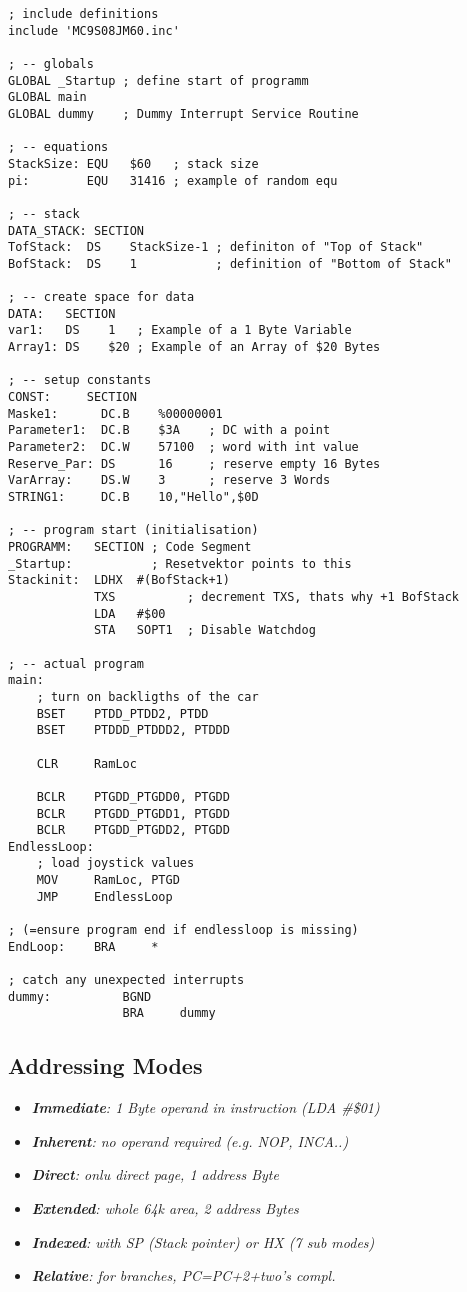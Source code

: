 \begin{lstlisting}
; include definitions
include 'MC9S08JM60.inc'

; -- globals
GLOBAL _Startup ; define start of programm
GLOBAL main
GLOBAL dummy    ; Dummy Interrupt Service Routine

; -- equations
StackSize: EQU   $60   ; stack size
pi:        EQU   31416 ; example of random equ

; -- stack
DATA_STACK: SECTION
TofStack:  DS    StackSize-1 ; definiton of "Top of Stack"
BofStack:  DS    1           ; definition of "Bottom of Stack"

; -- create space for data
DATA:   SECTION
var1:   DS    1   ; Example of a 1 Byte Variable
Array1: DS    $20 ; Example of an Array of $20 Bytes

; -- setup constants
CONST:     SECTION
Maske1:      DC.B    %00000001
Parameter1:  DC.B    $3A    ; DC with a point
Parameter2:  DC.W    57100  ; word with int value
Reserve_Par: DS      16     ; reserve empty 16 Bytes
VarArray:    DS.W    3      ; reserve 3 Words
STRING1:     DC.B    10,"Hello",$0D

; -- program start (initialisation)
PROGRAMM:   SECTION ; Code Segment
_Startup:           ; Resetvektor points to this
Stackinit:  LDHX  #(BofStack+1)
            TXS          ; decrement TXS, thats why +1 BofStack
            LDA   #$00
            STA   SOPT1  ; Disable Watchdog

; -- actual program
main:
    ; turn on backligths of the car
    BSET    PTDD_PTDD2, PTDD
    BSET    PTDDD_PTDDD2, PTDDD

    CLR     RamLoc

    BCLR    PTGDD_PTGDD0, PTGDD
    BCLR    PTGDD_PTGDD1, PTGDD
    BCLR    PTGDD_PTGDD2, PTGDD
EndlessLoop:
    ; load joystick values
    MOV     RamLoc, PTGD
    JMP     EndlessLoop

; (=ensure program end if endlessloop is missing)
EndLoop:    BRA     *

; catch any unexpected interrupts
dummy:          BGND
                BRA     dummy

\end{lstlisting}

\subsection{Addressing Modes}

\begin{itemize}
    \item{\textit{\textbf{Immediate}: 1 Byte operand in instruction (LDA \#\$01)}}
    \item{\textit{\textbf{Inherent}: no operand required (e.g. NOP, INCA..)}}
    \item{\textit{\textbf{Direct}: onlu direct page, 1 address Byte}}
    \item{\textit{\textbf{Extended}: whole 64k area, 2 address Bytes}}
    \item{\textit{\textbf{Indexed}: with SP (Stack pointer) or HX (7 sub modes)}}
    \item{\textit{\textbf{Relative}: for branches, PC=PC+2+two's compl.}}
\end{itemize}

